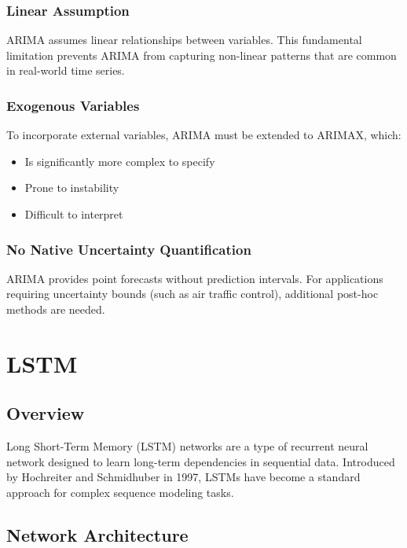 \documentclass[12pt,a4paper]{article}
\begin{document}
\subsubsection{Linear Assumption}

ARIMA assumes linear relationships between variables. This fundamental limitation prevents ARIMA from capturing non-linear patterns that are common in real-world time series.

\subsubsection{Exogenous Variables}

To incorporate external variables, ARIMA must be extended to ARIMAX, which:
\begin{itemize}
    \item Is significantly more complex to specify
    \item Prone to instability
    \item Difficult to interpret
\end{itemize}

\subsubsection{No Native Uncertainty Quantification}

ARIMA provides point forecasts without prediction intervals. For applications requiring uncertainty bounds (such as air traffic control), additional post-hoc methods are needed.


\section{LSTM}

\subsection{Overview}

Long Short-Term Memory (LSTM) networks are a type of recurrent neural network designed to learn long-term dependencies in sequential data. Introduced by Hochreiter and Schmidhuber in 1997, LSTMs have become a standard approach for complex sequence modeling tasks.

\subsection{Network Architecture}
\end{document}
